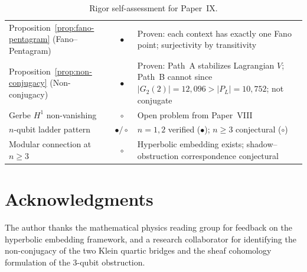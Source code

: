 \documentclass[11pt,a4paper]{article}
\theoremstyle{remark}
\begin{document}
\begin{table}[H]
\begin{tabular}{l c p{6.5cm}}
Proposition~\ref{prop:fano-pentagram} (Fano--Pentagram) & $\bullet$ &
  Proven: each context has exactly one Fano point; surjectivity by
  transitivity \\
Proposition~\ref{prop:non-conjugacy} (Non-conjugacy) & $\bullet$ &
  Proven: Path~A stabilizes Lagrangian $V$; Path~B cannot since
  $|G_2(2)| = 12{,}096 > |P_L| = 10{,}752$; not conjugate \\
Gerbe $H^1$ non-vanishing & $\circ$ &
  Open problem from Paper~VIII \\
$n$-qubit ladder pattern & $\bullet/\circ$ &
  $n=1,2$ verified ($\bullet$); $n \geq 3$ conjectural ($\circ$) \\
Modular connection at $n \geq 3$ & $\circ$ &
  Hyperbolic embedding exists; shadow--obstruction correspondence
  conjectural \\
\bottomrule
\end{tabular}
\caption{Rigor self-assessment for Paper~IX.}
\label{tab:rigor}
\end{table}

\section*{Acknowledgments}

The author thanks the mathematical physics reading group for feedback
on the hyperbolic embedding framework, and a research collaborator for
identifying the non-conjugacy of the two Klein quartic bridges and the
sheaf cohomology formulation of the 3-qubit obstruction.
\end{document}
